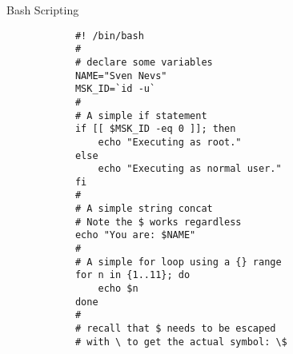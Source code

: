 \documentclass[11pt]{beamer}
\begin{document}
\begin{frame}[fragile]{Bash Scripting}
\begin{minipage}[t]{\textwidth}
\begin{minipage}[t]{.5\textwidth}
        \begin{center}
          \begin{verbatim}
            #! /bin/bash
            #
            # declare some variables
            NAME="Sven Nevs"
            MSK_ID=`id -u`
            #
            # A simple if statement
            if [[ $MSK_ID -eq 0 ]]; then
                echo "Executing as root."
            else
                echo "Executing as normal user."
            fi
            #
            # A simple string concat
            # Note the $ works regardless
            echo "You are: $NAME"
            #
            # A simple for loop using a {} range
            for n in {1..11}; do
                echo $n
            done
            #
            # recall that $ needs to be escaped
            # with \ to get the actual symbol: \$
          \end{verbatim}
        \end{center}
      \end{minipage}
  \end{minipage}
\end{frame}
\end{document}
